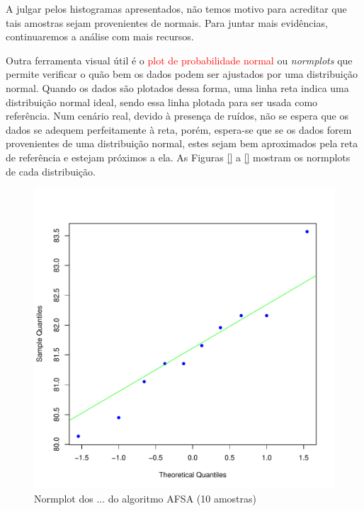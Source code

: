 \documentclass[conference]{IEEEtran}
\begin{document}
A julgar pelos histogramas apresentados, não temos motivo para acreditar que tais amostras sejam provenientes de normais.
Para juntar mais evidências, continuaremos a análise com mais recursos.

Outra ferramenta visual útil é o \textcolor{red}{plot de probabilidade normal} ou \textit{normplots} que permite verificar o quão bem os dados podem ser ajustados por uma distribuição normal.
Quando os dados são plotados dessa forma, uma linha reta indica uma distribuição normal ideal, sendo essa linha plotada para ser usada como referência.
Num cenário real, devido à presença de ruídos, não se espera que os dados se adequem perfeitamente à reta, porém, espera-se que se os dados forem provenientes de uma distribuição normal, estes sejam bem aproximados pela reta de referência e estejam próximos a ela.
As Figuras \ref{} a \ref{} mostram os normplots de cada distribuição.

\begin{figure}[h]
	\centering
	\includegraphics[width=\linewidth]{img/bluenorm_afsa_cmfdr.pdf}
	\caption{Normplot dos ... do algoritmo AFSA (10 amostras)}
	\label{fig:hist_afsa_cmfdr}
\end{figure}
\end{document}
